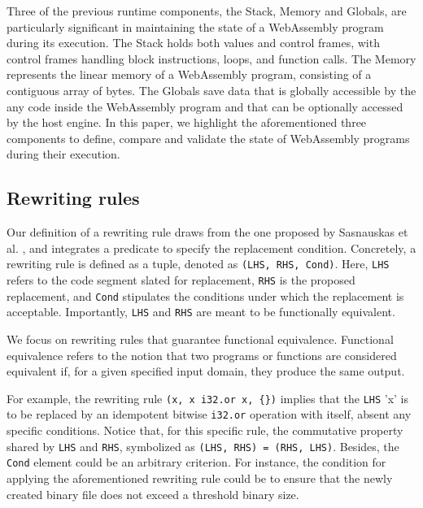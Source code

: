 \documentclass[a4paper,fleqn]{cas-dc}
\newcommand{\Wasm}{WebAssembly\xspace}
\begin{document}
Three of the previous runtime components, the Stack, Memory and Globals, are particularly significant in maintaining the state of a WebAssembly program during its execution. 
The Stack holds both values and control frames, with control frames handling block instructions, loops, and function calls. 
The Memory represents the linear memory of a WebAssembly program, consisting of a contiguous array of bytes.
The Globals save data that is globally accessible by the any code inside the \Wasm program and that can be optionally accessed by the host engine.
In this paper, we highlight the aforementioned three components to define, compare and validate the state of WebAssembly programs during their execution. 



\subsection{Rewriting rules}
\label{rewriting}

Our definition of a rewriting rule draws from the one proposed by Sasnauskas et al. \cite{2017arXiv171104422S}, and integrates a predicate to specify the replacement condition.
Concretely, a rewriting rule is defined as a tuple, denoted as \texttt{(LHS, RHS, Cond)}. Here, \texttt{LHS} refers to the code segment slated for replacement, \texttt{RHS} is the proposed replacement, and \texttt{Cond} stipulates the conditions under which the replacement is acceptable.
Importantly, \texttt{LHS} and \texttt{RHS} are meant to be functionally equivalent.

We focus on rewriting rules that guarantee functional equivalence. 
Functional equivalence refers to the notion that two programs or functions are considered equivalent if, for a given specified input domain, they produce the same output\cite{10.1145/2594291.2594334}. 

For example, the rewriting rule \texttt{(x,\ x\ i32.or\ x, \{\})} implies that the \texttt{LHS} 'x' is to be replaced by an idempotent bitwise \texttt{i32.or} operation with itself, absent any specific conditions.
Notice that, for this specific rule, the commutative property shared by \texttt{LHS} and \texttt{RHS}, symbolized as \texttt{(LHS, RHS) = (RHS, LHS)}.
Besides, the \texttt{Cond} element could be an arbitrary criterion. 
For instance, the condition for applying the aforementioned rewriting rule could be to ensure that the newly created binary file does not exceed a threshold binary size.
\end{document}
